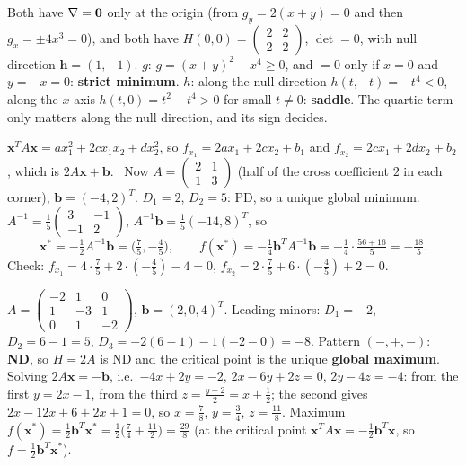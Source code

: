 \begin{solutions}
\begin{itemize}
    \end{itemize}
    \item Both have $\nabla = \mathbf{0}$ only at the origin (from $g_y = 2 (x + y) = 0$ and then $g_x = \pm 4 x^3 = 0$), and both have $H(0,0) = \begin{pmatrix} 2 & 2 \\ 2 & 2 \end{pmatrix}$, $\det = 0$, with null direction $\mathbf{h} = (1, -1)$. $g$: $g = (x + y)^2 + x^4 \ge 0$, and $= 0$ only if $x = 0$ and $y = -x = 0$: \textbf{strict minimum}. $h$: along the null direction $h(t, -t) = -t^4 < 0$, along the $x$-axis $h(t, 0) = t^2 - t^4 > 0$ for small $t \ne 0$: \textbf{saddle}. The quartic term only matters along the null direction, and its sign decides.
    \item $\mathbf{x}^T A \mathbf{x} = a x_1^2 + 2 c x_1 x_2 + d x_2^2$, so $f_{x_1} = 2 a x_1 + 2 c x_2 + b_1$ and $f_{x_2} = 2 c x_1 + 2 d x_2 + b_2$, which is $2 A \mathbf{x} + \mathbf{b}$. \checkmark\ Now $A = \begin{pmatrix} 2 & 1 \\ 1 & 3 \end{pmatrix}$ (half of the cross coefficient $2$ in each corner), $\mathbf{b} = (-4, 2)^T$. $D_1 = 2$, $D_2 = 5$: PD, so a unique global minimum. $A^{-1} = \tfrac15 \begin{pmatrix} 3 & -1 \\ -1 & 2 \end{pmatrix}$, $A^{-1} \mathbf{b} = \tfrac15 (-14, 8)^T$, so
    \[\mathbf{x}^* = -\tfrac12 A^{-1} \mathbf{b} = \bigl(\tfrac75, -\tfrac45\bigr), \qquad f(\mathbf{x}^*) = -\tfrac14 \mathbf{b}^T A^{-1} \mathbf{b} = -\tfrac14 \cdot \tfrac{56 + 16}{5} = -\tfrac{18}{5}.\]
    Check: $f_{x_1} = 4 \cdot \tfrac75 + 2 \cdot (-\tfrac45) - 4 = 0$, $f_{x_2} = 2 \cdot \tfrac75 + 6 \cdot (-\tfrac45) + 2 = 0$.
    \item $A = \begin{pmatrix} -2 & 1 & 0 \\ 1 & -3 & 1 \\ 0 & 1 & -2 \end{pmatrix}$, $\mathbf{b} = (2, 0, 4)^T$. Leading minors: $D_1 = -2$, $D_2 = 6 - 1 = 5$, $D_3 = -2 (6 - 1) - 1 (-2 - 0) = -8$. Pattern $(-, +, -)$: \textbf{ND}, so $H = 2 A$ is ND and the critical point is the unique \textbf{global maximum}. Solving $2 A \mathbf{x} = -\mathbf{b}$, i.e.\ $-4 x + 2 y = -2$, $2 x - 6 y + 2 z = 0$, $2 y - 4 z = -4$: from the first $y = 2 x - 1$, from the third $z = \tfrac{y + 2}{2} = x + \tfrac12$; the second gives $2 x - 12 x + 6 + 2 x + 1 = 0$, so $x = \tfrac78$, $y = \tfrac34$, $z = \tfrac{11}{8}$. Maximum $f(\mathbf{x}^*) = \tfrac12 \mathbf{b}^T \mathbf{x}^* = \tfrac12 \bigl(\tfrac74 + \tfrac{11}{2}\bigr) = \tfrac{29}{8}$ (at the critical point $\mathbf{x}^T A \mathbf{x} = -\tfrac12 \mathbf{b}^T \mathbf{x}$, so $f = \tfrac12 \mathbf{b}^T \mathbf{x}^*$).

\end{solutions}
